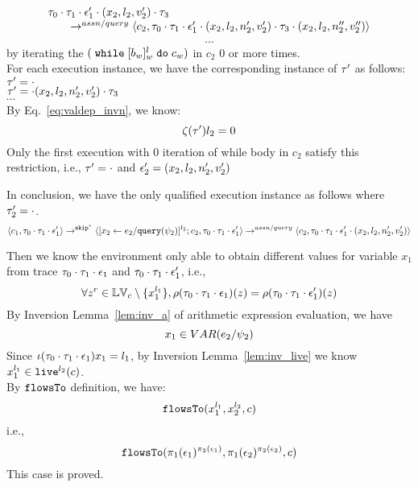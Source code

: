 \begin{subproof}
\begin{subproof}[Subproof]
\begin{enumerate}
\[\begin{array}{l}
{  \ensuremath{\mathtt{\tau}}_0 \cdot \ensuremath{\mathtt{\tau}}_1 \cdot \ensuremath{\mathtt{\epsilon}}_1' \cdot (x_2, l_2, v_2') \cdot \ensuremath{\mathtt{\tau}}_3} 
  \\ \qquad
  \rightarrow^{assn/query} 
  \langle {c}_2,  \mathtt{\tau}_0 \cdot \mathtt{\tau}_1 \cdot \mathtt{\epsilon}_1' \cdot (x_2, l_2, n_2', v_2') \cdot \mathtt{\tau}_3 \cdot (x_2, l_2, n_2'', v_2'') \rangle 
 \end{array}
 \]
\[
  \cdots
\] 
by iterating the $(\;\mathtt{while}\; [b_w]^l_w \;\mathtt{do}\; c_w)$ in $c_2$ $0$ or more times.
%
\\
%
For each execution instance, we have the corresponding instance of $\mathtt{\tau}'$ as follows:
\\
$\mathtt{\tau}'  = \cdot$
\\
$\mathtt{\tau}' = \cdot (x_2, l_2, n_2', v_2') \cdot \mathtt{\tau}_3 $
%
\\
$\cdots$
%
\\
%
By Eq.~\ref{eq:valdep_invn}, we know:
%
\[
 \mathtt{\zeta}(\mathtt{\tau}') l_2 = 0
\]
%
Only the first execution with 0 iteration of while body in $c_2$ satisfy this restriction, i.e., $\mathtt{\tau}' = \cdot$ and $\mathtt{\epsilon}_2' = (x_2, l_2, n_2', v_2')$
%
\end{enumerate}
In conclusion, we have the only qualified execution instance as follows where $\mathtt{\tau}_2' = \cdot$.
  \[
  \langle c_1, \mathtt{\tau}_0 \cdot \mathtt{\tau}_1 \cdot \mathtt{\epsilon}_1' \rangle 
  \rightarrow^{\mathtt{skip}^*} 
  \langle [\mathrel{ {x}_2 \leftarrow e_2 / {\tt query}(\psi_2) }]^{l_2} ; {c}_2, \mathtt{\tau}_0 \cdot \mathtt{\tau}_1 \cdot \mathtt{\epsilon}_1' \rangle 
  \rightarrow^{assn/query} 
  \langle {c}_2,  \mathtt{\tau}_0 \cdot \mathtt{\tau}_1 \cdot \mathtt{\epsilon}_1' \cdot (x_2, l_2, n_2', v_2') \rangle 
 \]
\end{subproof}
%
Then we know the environment only able to obtain different values for variable $x_1$ 
from trace $\mathtt{\tau}_0 \cdot \mathtt{\tau}_1 \cdot \mathtt{\epsilon}_1$ and 
$\mathtt{\tau}_0 \cdot \mathtt{\tau}_1 \cdot \mathtt{\epsilon}_1'$, i.e.,
\[
  \forall z^r \in \mathbb{LV}_c \setminus \{x_1^{l_1}\} ,
  \rho(\mathtt{\tau}_0 \cdot \mathtt{\tau}_1 \cdot \mathtt{\epsilon}_1) (z) =  
  \rho(\mathtt{\tau}_0 \cdot \mathtt{\tau}_1 \cdot \mathtt{\epsilon}_1') (z)
\]
%
By {Inversion Lemma~\ref{lem:inv_a}} of arithmetic expression evaluation, we have
\[
  x_1 \in VAR(e_2 / \psi_2) 
\]
Since $\iota(\mathtt{\tau}_0 \cdot \mathtt{\tau}_1 \cdot \mathtt{\epsilon}_1) x_1 = l_1$, by Inversion Lemma~\ref{lem:inv_live} we know $x_1^{l_1} \in \mathtt{live}^{l_2}(c)$.
%
\\
%
By $\mathtt{flowsTo}$ definition, we have:
%
\[
\mathtt{flowsTo}(x_1^{l_1}, {x}_2^{l_2}, c)
\]
i.e.,
%
\[
\mathtt{flowsTo}(\pi_1(\mathtt{\epsilon}_1)^{\pi_2(\mathtt{\epsilon}_1)}, \pi_1(\mathtt{\epsilon}_2)^{\pi_2(\mathtt{\epsilon}_2)}, c)
 \]
%
This case is proved.
\end{subproof}
